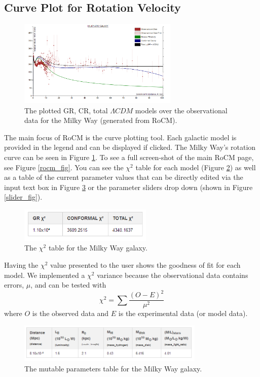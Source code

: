 \documentclass[conference]{IEEEtran}
\begin{document}
\subsection{Curve Plot for Rotation Velocity}
\begin{figure}[h!]
\centering
\includegraphics[width=3in, frame]{MILKY-WAY-PLOT2}
\caption{The plotted GR, CR, total $\Lambda CDM$ models over the observational data for the Milky Way (generated from RoCM).}
\label{milkywayplot}
\end{figure}
The main focus of RoCM is the curve plotting tool. Each galactic model is provided in the legend and can be displayed if clicked. The Milky Way's rotation curve can be seen in Figure \ref{milkywayplot}. To see a full screen-shot of the main RoCM page, see Figure \ref{rocm_fig}. You can see the $\chi^2$ table for each model (Figure \ref{chi_fig}) as well as a table of the current parameter values that can be directly edited via the input text box in Figure \ref{param_table_fig} or the parameter sliders drop down (shown in Figure \ref{slider_fig}). 

\begin{figure}[h!]
\centering
\includegraphics[width=2.5in]{MILKY-WAY-CHI}
\caption{The $\chi^2$ table for the Milky Way galaxy.}
\label{chi_fig}
\end{figure}

Having the $\chi^2$ value presented to the user shows the goodness of fit for each model. We implemented a $\chi^2$ variance because the observational data contains errors, $\mu$, and can be tested with
\begin{equation}
\chi^2 = \sum \frac{(O-E)^2}{\mu^2}
\end{equation} 
where $O$ is the observed data and $E$ is the experimental data (or model data). 

\begin{figure}[h!]
\centering
\includegraphics[width=3.5in]{MILKY-WAY-PARAMS}
\caption{The mutable parameters table for the Milky Way galaxy.}
\label{param_table_fig}
\end{figure}
\end{document}
